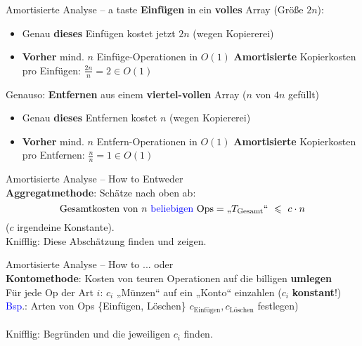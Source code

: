 \begin{frame}{Amortisierte Analyse – a taste}
	\textbf{Einfügen} in ein \textbf{volles} Array (Größe $2n$):
	\begin{itemize}
		\implitem Array muss vergrößert (also umkopiert werden)
		\pause
		\item Genau \textbf{dieses} Einfügen kostet jetzt $2n$ (wegen Kopiererei)
		\pause
		\item \textbf{Vorher} mind. $n$ Einfüge-Operationen  in $O(1)$
		\pause
		\implitem \textbf{Amortisierte} Kopierkosten pro Einfügen: $\frac{2n}{n} = 2 \in O(1)$
	\end{itemize} \pause
	\forcenewline
	Genauso: \textbf{Entfernen} aus einem \textbf{viertel-vollen} Array ($n$ von $4n$ gefüllt)
	\begin{itemize} 
		\implitem Array muss verkleinert (= umkopiert) werden
		\pause
		\item Genau \textbf{dieses} Entfernen kostet $n$ (wegen Kopiererei)
		\pause
		\item \textbf{Vorher} mind. $n$ Entfern-Operationen  in $O(1)$
		\pause
		\implitem \textbf{Amortisierte} Kopierkosten pro Entfernen: $\frac{n}{n} = 1 \in O(1)$
	\end{itemize}
\end{frame}

\begin{frame}{Amortisierte Analyse – How to}
	Entweder \\
	\textbf{Aggregatmethode}: Schätze nach oben ab:
	\[
		\text{Gesamtkosten von $n$ \textcolor{blue}{beliebigen} Ops} = \text{„}T_\text{Gesamt}\text{“} \ \leq \ c \cdot n 
	\]
	($c$ irgendeine Konstante). \\ \forcenewline
	Knifflig: Diese Abschätzung finden und zeigen.
\end{frame}

\begin{frame}{Amortisierte Analyse – How to}
	... oder \\
	\textbf{Kontomethode}: Kosten von teuren Operationen auf die billigen \textbf{umlegen} \\ \forcenewline 
	\pause
	\hanging Für jede Op der Art $i$: \quad  $c_i$ „Münzen“ auf ein „Konto“ einzahlen ($c_i$ \textbf{konstant}!) \\ 
	\pause
	\textcolor{blue}{Bsp}.: \hanging Arten von Ops \{Einfügen, Löschen\} \impl $c_\text{Einfügen}, c_\text{Löschen}$ festlegen) \\
	\pause
	 \\
	\pause \forcenewline
	Knifflig: Begründen und die jeweiligen $c_i$ finden.
\end{frame}

